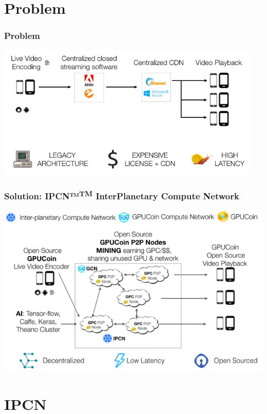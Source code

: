 \documentclass[10pt,handout]{beamer}
\begin{document}
\section{Problem}
\begin{frame}[t]\frametitle{Problem}
 \includegraphics[width=0.95\textwidth]{static/problem-architecture-trans}
\end{frame}
\begin{frame}[t]\frametitle{Solution: IPCN™\textsuperscript{TM} InterPlanetary Compute Network}
 \includegraphics[width=.95\textwidth]{static/gpucoin-solution-trans-ai}

\end{frame}
\section{IPCN}

\end{document}
